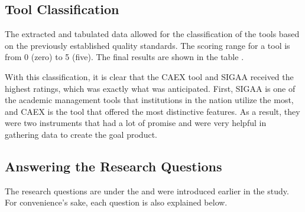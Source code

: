 \subsection{Tool Classification}\label{sec:gl-tool-classification}

The extracted and tabulated data allowed for the classification of the tools based on the previously established quality standards. The scoring range for a tool is from 0 (zero) to 5 (five). The final results are shown in the table .



With this classification, it is clear that the \ac{CAEX} tool and \ac{SIGAA} received the highest ratings, which was exactly what was anticipated. First, \ac{SIGAA} is one of the academic management tools that institutions in the nation utilize the most, and \ac{CAEX} is the tool that offered the most distinctive features. As a result, they were two instruments that had a lot of promise and were very helpful in gathering data to create the goal product.

\subsection{Answering the Research Questions}\label{sec:gl-answer-research-questions}

The research questions are under the  and were introduced earlier in the study. For convenience's sake, each question is also explained below.

